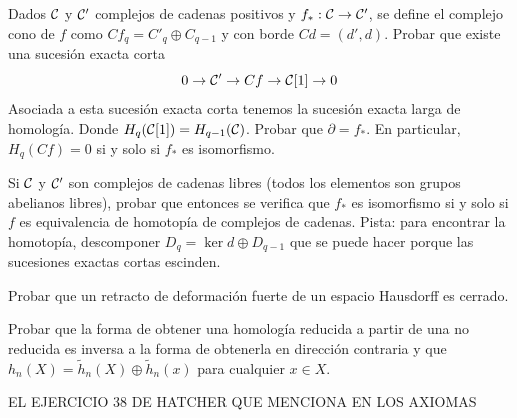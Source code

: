 \documentclass[TA.tex]{subfiles}
\begin{document}
\begin{ejer}
Dados $\mathcal{C}$ y $\mathcal{C}'$ complejos de cadenas positivos y $f_*:\mathcal{C}\to\mathcal{C}'$, se define el complejo cono de $f$ como $Cf_q=C'_q\oplus C_{q-1}$ y con borde $Cd=(d',d)$. Probar que existe una sucesión exacta corta
\[
0\to \mathcal{C}'\to Cf\to \mathcal{C}[1]\to 0
\]
Asociada a esta sucesión exacta corta tenemos la sucesión exacta larga de homología. Donde $H_q(\mathcal{C}[1])=H_{q-1}(\mathcal{C})$. Probar que $\partial=f_*$. En particular, $H_q(Cf)=0$ si y solo si $f_*$ es isomorfismo. 

Si $\mathcal{C}$ y $\mathcal{C}'$ son complejos de cadenas libres (todos los elementos son grupos abelianos libres), probar que entonces se verifica que $f_*$ es isomorfismo si y solo si $f$ es equivalencia de homotopía de complejos de cadenas.  Pista: para encontrar la homotopía, descomponer $D_q=\ker d\oplus D_{q-1}$ que se puede hacer porque las sucesiones exactas cortas escinden. 

\end{ejer}
\begin{ejer}
Probar que un retracto de deformación fuerte de un espacio Hausdorff es cerrado.
\end{ejer}

\begin{ejer}
Probar que la forma de obtener una homología reducida a partir de una no reducida es inversa a la forma de obtenerla en dirección contraria y que $h_n(X)=\tilde{h}_n(X)\oplus\tilde{h}_n(x)$ para cualquier $x\in X$.
\end{ejer}

\begin{ejer}
EL EJERCICIO 38 DE HATCHER QUE MENCIONA EN LOS AXIOMAS
\end{ejer}
\end{document}
